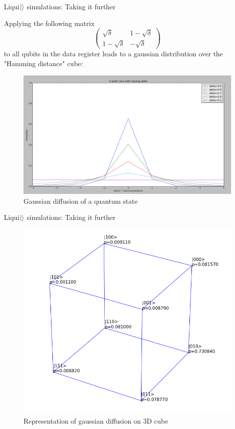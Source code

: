 \documentclass[10pt]{beamer}
\begin{document}
{
\begin{frame}{Liqui$\ket{}$ simulations: Taking it further}

Applying the following matrix
\begin{equation}
\begin{pmatrix}
 \sqrt{\delta} & 1-\sqrt{\delta} \\ 
 1-\sqrt{\delta} & -\sqrt{\delta}
 \end{pmatrix}
\end{equation}
to all qubits in the data register leads to a gaussian distribution over the "Hamming distance" cube:

\begin{figure}
\includegraphics[scale=0.2]{4qubitdiffusion.png}
       \caption{\footnotesize{Gaussian diffusion of a quantum state} }
\end{figure}

\end{frame}
}

{
\begin{frame}{Liqui$\ket{}$ simulations: Taking it further}

\begin{figure}
\includegraphics[scale=0.33]{cube_diffused.png}
       \caption{\footnotesize{Representation of gaussian diffusion on 3D cube} }
\end{figure}
\end{frame}
}
\end{document}
